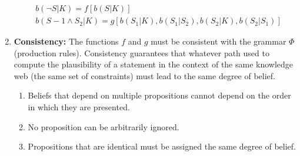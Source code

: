 \documentclass[
  letterpaper,
  12pt,
  british]{tufte-book}
\theoremstyle{plain}
\theoremstyle{plain}
\theoremstyle{definition}
\theoremstyle{remark}
\begin{document}
\begin{enumerate}
  \begin{align}
          &b(\neg S|K) = f[b(S|K)] \tag{NOT}\\
          &b(S-1 \land S_2 | K) = g[b(S_1|K), b(S_1|S_2), b(S_2|K), b(S_2|S_1)] \tag{AND}
  \end{align}
\item
  \textbf{Consistency:} The functions \(f\) and \(g\) must be consistent
  with the grammar \(\Phi\) (production rules). Consistency guarantees
  that whatever path used to compute the plausibility of a statement in
  the context of the same knowledge web (the same set of constraints)
  must lead to the same degree of belief.

  \begin{enumerate}
  \def\labelenumii{(\alph{enumii})}
  \item
    Beliefs that depend on multiple propositions cannot depend on the
    order in which they are
    presented.\protect\hypertarget{axiom:order}{}{}
  \item
    No proposition can be arbitrarily ignored.
  \item
    Propositions that are identical must be assigned the same degree of
    belief.
  \end{enumerate}
\end{enumerate}
\end{document}
